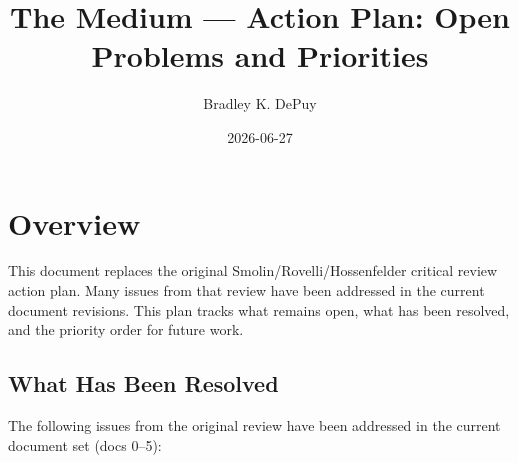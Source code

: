 \documentclass[11pt,letterpaper]{article}
\author{Bradley K. DePuy}
\date{2026-06-27}
\title{The Medium --- Action Plan: Open Problems and Priorities}
\begin{document}
\maketitle
\tableofcontents


\section{Overview}
\label{sec:org714e66d}

This document replaces the original Smolin/Rovelli/Hossenfelder critical review
action plan. Many issues from that review have been addressed in the current
document revisions. This plan tracks what remains open, what has been resolved,
and the priority order for future work.

\subsection{What Has Been Resolved}
\label{sec:org0d64acc}

The following issues from the original review have been addressed in the
current document set (docs 0--5):
\end{document}

